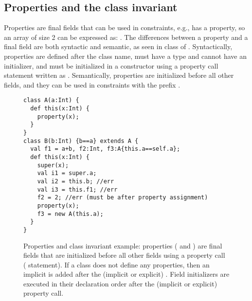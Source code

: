 \subsection{Properties and the class invariant}
Properties are final fields that can be used in constraints,
    e.g.,  has a  property,
    so an array of size 2 can be expressed as: .
The differences between a property and a final field are both syntactic and semantic,
    as seen in class  of .
Syntactically, properties are defined after the class name,
    must have a type and cannot have an initializer,
    and must be initialized in a constructor using a property call statement written as .
Semantically, properties are initialized before all other fields,
    and they can be used in constraints with the prefix .


\begin{figure}
\vspace{-0.2cm}\begin{lstlisting}
class A(a:Int) {
  def this(x:Int) {
    property(x);
  }
}
class B(b:Int) {b==a} extends A {
  val f1 = a+b, f2:Int, f3:A{this.a==self.a};
  def this(x:Int) {
    super(x);
    val i1 = super.a;
    val i2 = this.b; //err
    val i3 = this.f1; //err
    f2 = 2; //err (must be after property assignment)
    property(x);
    f3 = new A(this.a);
  }
}
\end{lstlisting}\vspace{-0.2cm}
\caption{Properties and class invariant example:
        properties ( and )
        are final fields that are initialized before all other fields
        using a property call ( statement).
    {If a class does not define any properties, then
        an implicit  is added
        after the (implicit or explicit) .}
    {Field initializers are executed in their declaration order
        after the (implicit or explicit) property call.}
    }
\label{Figure:Properties}
\end{figure}


